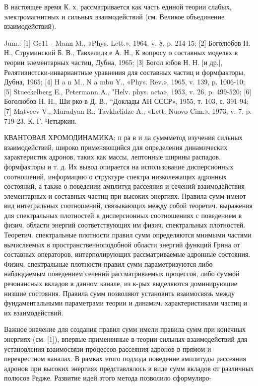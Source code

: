 \documentclass[10pt]{article}
\begin{document}
В настоящее время К. х. рассматривается как часть единой теории слабых, электромагнитных и сильных взаимодействий (см. Великое объединение взаимодействий).



Jum.: [1] Ge11 - Mann M., «Phys. Lett.», 1964, v. 8, p. 214-15; [2] Боголюбов Н. Н., Струминский Б. В., Тавхелидз е А. Н., К вопросу о составных моделях в теории элементарных частиц, Дубна, 1965; [3] Богол юбов Н. Н. [и др.], Релятивистски-инвариантные уравнения для составных частиц и формфакторы, Дубна, 1965; [4] H a n M., N a mbu Y., «Phys. Rev.», 1965, v. 139, p. 1006-10; [5] Stueckelberg E., Petermann A., "Helv. phys. acta», 1953, v. 26, p. 499-520; [6] Боголюбов Н. Н., Ши рко в Д. В., “Доклады АН СССР», 1955, т. 103, с. 391-94; [7] Matveev V., Muradyan R., Tavkhelidze A., «Lett. Nuovo Cim.», 1973, v. 7, p. 719-23. К. Г. Четыркин.



КВАНТОВАЯ ХРОМОДИНАМИКА; п ра в и ла суммметод изучения сильных взаимодействий, широко применяющийся для определения динамических характеристик адронов, таких как массы, лептонные ширины распадов, формфакторы и т. д. Их вывод опирается на использование дисперсионных соотношений, информацию о структуре спектра низколежащих адронных состояний, а также о поведении амплитуд рассеяния и сечений взаимодействия элементарных и составных частиц при высоких энергиях. Правила сумм имеют вид интегральных соотношений, связывающих между собой теоретич. выражения для спектральных плотностей в дисперсионных соотношениях с поведением в физич. области энергий соответствующих им физич. спектральных плотностей. Теоретич. спектральные плотности правил сумм определяются мнимыми частями вычисляемых в пространственноподобной области энергий функций Грина от составных операторов, интерполирующих рассматриваемые адронные состояния. Физич. спектральные плотности правил сумм параметризуются либо наблюдаемым поведением сечений рассматриваемых процессов, либо суммой резонансных вкладов в данном канале, из к-рых выделяются доминирующие низшие состояния. Правила сумм позволяют установить взаимосвязь между фундаментальными параметрами теории и динамич. характеристиками частиц и их взаимодействий.



Важное значение для создания правил сумм имели правила сумм при конечных энергиях (см. [1]), впервые примененные в теории сильных взаимодействий для установления взаимосвязи процессов рассеяния адронов в прямом и перекрестном каналах. В рамках этого подхода поведение амплитуды рассеяния адронов при высоких энергиях представлялось в виде сумм вкладов от различных полюсов Редже. Развитие идей этого метода позволило сформулиро-
\end{document}

